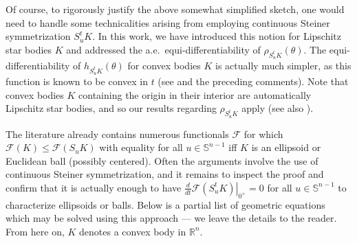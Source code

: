 \documentclass[11pt]{article}
\theoremstyle{definition}
\theoremstyle{proof}
\newcommand{\dt}[1]{\left . \frac{d}{dt} #1 \right |_{0^+}}
\DeclareMathOperator{\+}{\mathop{\tilde{+}}}
\newcommand{\R}{\mathbb{R}}
\renewcommand{\S}{\mathbb{S}}
\newcommand{\F}{\mathcal{F}}
\numberwithin{equation}{section}
\numberwithin{equation}{section}
\begin{document}
\smallskip

Of course, to rigorously justify the above somewhat simplified sketch, one would need to handle some technicalities arising from employing continuous Steiner symmetrization $S_u^t K$. In this work, we have introduced this notion for Lipschitz star bodies $K$ and addressed the a.e.~equi-differentiability of $\rho_{S_u^t K}(\theta)$. The equi-differentiability of $h_{S_u^t K}(\theta)$ for convex bodies $K$ is actually much simpler, as this function is known to be convex in $t$ (see \cite[Lemma 2.1]{Saroglou-GeneralizedBCD} and the preceding comments). Note that convex bodies $K$ containing the origin in their interior are automatically Lipschitz star bodies, and so our results regarding $\rho_{S_u^t K}$ apply (see also \cite[Proposition 4.3]{Saroglou-GeneralizedBCD}). 

\smallskip
The literature already contains numerous functionals $\F$ for which $\F(K) \leq \F(S_u K)$ with equality for all $u \in \S^{n-1}$ iff $K$ is an ellipsoid or Euclidean ball (possibly centered). Often the arguments involve the use of continuous Steiner symmetrization, and it remains to inspect the proof and confirm that 
it is actually enough to have $\dt{\F(S^t_u K)} = 0$ for all $u \in \S^{n-1}$ to characterize ellipsoids or balls. 
Below is a partial list of geometric equations which may be solved using this approach --- we leave the details to the reader.  
From here on, $K$ denotes a convex body in $\R^n$. 
\end{document}
